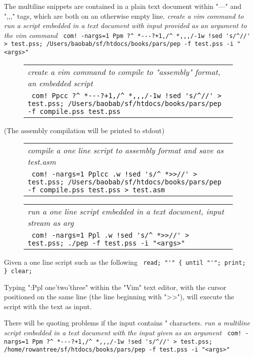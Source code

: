\documentclass[a4paper,12pt]{article}
\begin{document}
  The multiline snippets are contained in a plain text document within "---"
  and ",,," tags, which are both on an otherwise empty line.
 \emph{ create a vim command to run a script embedded in a text document }
 \emph{ with input provided as an argument to the vim command } 
 \verb| com! -nargs=1 Ppm ?^ *---?+1,/^ *,,,/-1w !sed 's/^//' > test.pss; /Users/baobab/sf/htdocs/books/pars/pep -f test.pss -i "<args>" |

 \begin{figure}
 \begin{tabular}{ l }
 \emph{ create a vim command to compile to "assembly" format, an embedded script  } \\ 
 \verb| com! Ppcc ?^ *---?+1,/^ *,,,/-1w !sed 's/^//' > test.pss; /Users/baobab/sf/htdocs/books/pars/pep -f compile.pss test.pss  |
 \end{tabular} 
 \end{figure}

  (The assembly compilation will be printed to stdout)
 \begin{figure}
 \begin{tabular}{ l }
 \emph{ compile a one line script to assembly format and save as test.asm  } \\ 
 \verb| com! -nargs=1 Pplcc .w !sed 's/^ *>>//' > test.pss; /Users/baobab/sf/htdocs/books/pars/pep -f compile.pss test.pss > test.asm |
 \end{tabular} 
 \end{figure}
 \begin{figure}
 \begin{tabular}{ l }
 \emph{ run a one line script embedded in a text document, input stream as arg } \\ 
 \verb| com! -nargs=1 Ppl .w !sed 's/^ *>>//' > test.pss; ./pep -f test.pss -i "<args>" |
 \end{tabular} 
 \end{figure}

  Given a one line script such as the following 
 \verb| read; "'" { until "'"; print; } clear; |


  Typing ":Ppl one'two'three" within the "Vim" text editor, with the cursor
  positioned on the same line (the line beginning with ">>"), will execute the
  script with the text as input.

 There will be quoting problems if the input contains " characters.
 \emph{ run a multiline script embedded in a text document }
 \emph{ with the input given as an argument  } 
 \verb| com! -nargs=1 Ppm ?^ *---?+1,/^ *,,,/-1w !sed 's/^//' > test.pss; /home/rowantree/sf/htdocs/books/pars/pep -f test.pss -i "<args>"  |
\end{document}
